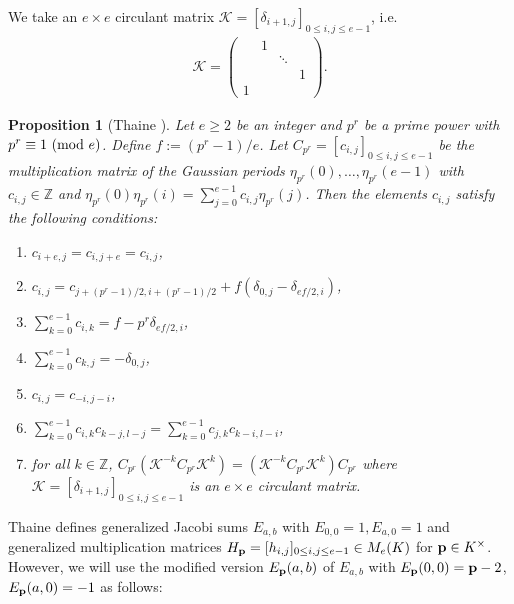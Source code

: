 \documentclass[a4paper, 11pt]{amsart}
\newcommand{\Z}{\mathbb Z}
\theoremstyle{plain}
\newtheorem{prop}[thm]{Proposition}
\theoremstyle{definition}
\renewcommand{\labelenumi}{\textup{(\arabic{enumi})}}
\numberwithin{equation}{section}
\begin{document}
We take an $e \times e$ circulant matrix $\mathcal{K}=[\delta_{i+1,j}]_{0\leq i,j\leq e-1}$, i.e. 
\begin{align*}
\mathcal{K} =
\left(
\begin{array}{cccc}
 & 1 & &  \\
 & &  \ddots &  \\
 & &  & 1 \\
1 & & & 
\end{array}\right). 
\end{align*}

\begin{prop}[{Thaine \cite[Proposition~8]{Tha04}}]\label{prop:T8}
Let $e \geq 2$ be an integer and 
$p^r$ be a prime power with $p^r\equiv 1\ ({\rm mod}\ e)$. 
Define $f:=(p^r-1)/e$.
Let $C_{p^r}=[c_{i,j}]_{0\leq i,j \leq e-1}$ be the multiplication matrix of the Gaussian periods $\eta_{p^r}(0),\ldots,\eta_{p^r}(e-1)$
with $c_{i,j} \in \Z$ and $\eta_{p^r}(0)\eta_{p^r}(i)=\sum_{j=0}^{e-1}c_{i,j}\eta_{p^r}(j)$. 
Then the elements $c_{i,j}$ satisfy the following conditions: 
\renewcommand{\labelenumi}{\textnormal{(\roman{enumi})}}
\begin{enumerate}
  \setlength{\parskip}{0cm}
  \setlength{\itemsep}{0cm}
\item $c_{i+e,j}=c_{i,j+e}=c_{i,j}$,
\item $c_{i,j}=c_{j+(p^r-1)/2,i+(p^r-1)/2} + f(\delta_{0,j}-\delta_{ef/2, i})$,
\item $\sum^{e-1}_{k=0}c_{i,k}=f-p^r\delta_{ef/2, i}$,
\item $\sum^{e-1}_{k=0}c_{k,j}=-\delta_{0,j}$,
\item $c_{i,j}=c_{-i,j-i}$,
\item $\sum^{e-1}_{k=0}c_{i,k}c_{k-j,l-j}=\sum^{e-1}_{k=0}c_{j,k}c_{k-i,l-i}$,
\item  for all $k \in \Z$, $C_{p^r}(\mathcal{K}^{-k}C_{p^r}\mathcal{K}^{k})=(\mathcal{K}^{-k}C_{p^r}\mathcal{K}^{k})C_{p^r}$ where $\mathcal{K}=[\delta_{i+1,j}]_{0\leq i,j\leq e-1}$ is an $e \times e$ circulant matrix.
\end{enumerate}
\end{prop}

Thaine \cite{Tha04} 
defines generalized Jacobi sums $E_{a,b}$ with $E_{0,0}=1, E_{a,0}=1$ 
and generalized multiplication matrices $H_{\bf p}=[h_{i,j}]_{0\leq i,j \leq e-1}\in M_e(K)$ for ${\bf p}\in K^\times$. 
However, we will use the modified version 
$E_{\bf p}(a,b)$ of $E_{a,b}$ 
with $E_{\bf p}(0,0)={\bf p}-2$, $E_{\bf p}(a,0)=-1$ as follows:
\end{document}
